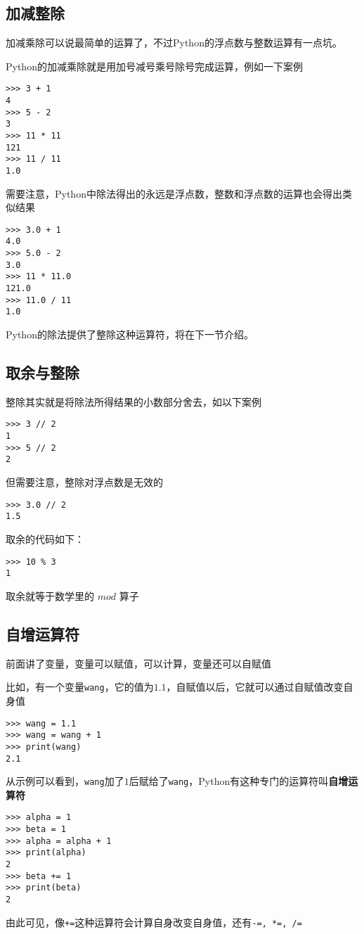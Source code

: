 \documentclass{book}
\begin{document}
\subsection{加减整除}
\indent 加减乘除可以说最简单的运算了，不过Python的浮点数与整数运算有一点坑。


Python的加减乘除就是用加号减号乘号除号完成运算，例如一下案例
\begin{verbatim}
>>> 3 + 1
4
>>> 5 - 2
3
>>> 11 * 11
121
>>> 11 / 11
1.0
\end{verbatim}
需要注意，Python中除法得出的永远是浮点数，整数和浮点数的运算也会得出类似结果
\begin{verbatim}
>>> 3.0 + 1
4.0
>>> 5.0 - 2
3.0
>>> 11 * 11.0
121.0
>>> 11.0 / 11
1.0
\end{verbatim}

Python的除法提供了整除这种运算符，将在下一节介绍。
\subsection{取余与整除}
\indent 整除其实就是将除法所得结果的小数部分舍去，如以下案例


\begin{verbatim}
>>> 3 // 2
1
>>> 5 // 2
2
\end{verbatim}
但需要注意，整除对浮点数是无效的

\begin{verbatim}
>>> 3.0 // 2
1.5
\end{verbatim}


取余的代码如下：
\begin{verbatim}
>>> 10 % 3
1
\end{verbatim}

取余就等于数学里的 $mod$ 算子
\subsection{自增运算符}
\indent 前面讲了变量，变量可以赋值，可以计算，变量还可以自赋值


比如，有一个变量\verb|wang|，它的值为$1.1$，自赋值以后，它就可以通过自赋值改变自身值


\begin{verbatim}
>>> wang = 1.1
>>> wang = wang + 1
>>> print(wang)
2.1
\end{verbatim}

从示例可以看到，\verb|wang|加了$1$后赋给了\verb|wang|，Python有这种专门的运算符叫\textbf{自增运算符}

\begin{verbatim}
>>> alpha = 1
>>> beta = 1
>>> alpha = alpha + 1
>>> print(alpha)
2
>>> beta += 1
>>> print(beta)
2
\end{verbatim}
由此可见，像\verb|+=|这种运算符会计算自身改变自身值，还有\verb|-=, *=, /=|
\end{document}
